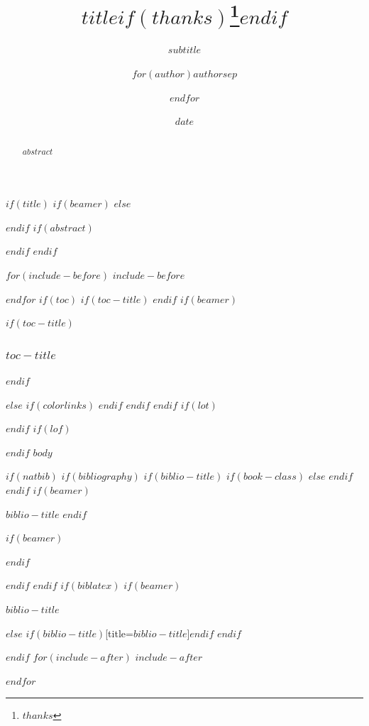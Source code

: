 \documentclass[$if(fontsize)$$fontsize$,$endif$$if(lang)$$babel-lang$,$endif$$if(papersize)$$papersize$paper,$endif$$if(beamer)$ignorenonframetext,$if(handout)$handout,$endif$$if(aspectratio)$aspectratio=$aspectratio$,$endif$$endif$$for(classoption)$$classoption$$sep$,$endfor$]{$documentclass$}
\title{$title$$if(thanks)$\thanks{$thanks$}$endif$}
\subtitle{$subtitle$}
\author{$for(author)$$author$$sep$ \and $endfor$}
\institute{$for(institute)$$institute$$sep$ \and $endfor$}
\date{$date$}
\newif\ifbibliography
\begin{document}
\sloppy  %
$if(title)$
$if(beamer)$
\frame{\titlepage}
$else$
\maketitle
\thispagestyle{empty}
$endif$
$if(abstract)$
\begin{abstract}
$abstract$
\end{abstract}
$endif$
$endif$

$for(include-before)$
$include-before$

$endfor$
$if(toc)$
$if(toc-title)$
\renewcommand*\contentsname{$toc-title$}
$endif$
$if(beamer)$
\begin{frame}
$if(toc-title)$
\frametitle{$toc-title$}
$endif$
\tableofcontents[hideallsubsections]
\end{frame}
$else$
{
$if(colorlinks)$
\hypersetup{linkcolor=$if(toccolor)$$toccolor$$else$$endif$}
$endif$
\setcounter{tocdepth}{$toc-depth$}
\tableofcontents
}
$endif$
$endif$
$if(lot)$
\listoftables
$endif$
$if(lof)$
\listoffigures
$endif$
$body$

$if(natbib)$
$if(bibliography)$
$if(biblio-title)$
$if(book-class)$
\renewcommand\bibname{$biblio-title$}
$else$
\renewcommand\refname{$biblio-title$}
$endif$
$endif$
$if(beamer)$
\begin{frame}[allowframebreaks]{$biblio-title$}
\bibliographytrue
$endif$

$if(beamer)$
\end{frame}
$endif$

$endif$
$endif$
$if(biblatex)$
$if(beamer)$
\begin{frame}[allowframebreaks]{$biblio-title$}
\bibliographytrue
\printbibliography[heading=none]
\end{frame}
$else$
\printbibliography$if(biblio-title)$[title=$biblio-title$]$endif$
$endif$

$endif$
$for(include-after)$
$include-after$

$endfor$
\end{document}
